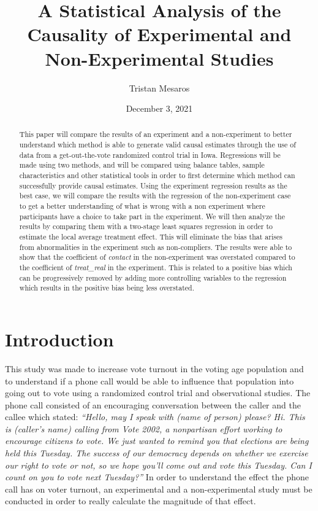 \documentclass[a4paper]{article}
\title{A Statistical Analysis of the Causality of Experimental and Non-Experimental Studies}
\author{Tristan Mesaros}
\affil{University of California, Santa Cruz}
\affil{Department of Economics}
\date{December 3, 2021}
\begin{document}
\maketitle

\begin{singlespace}
\begin{abstract}
This paper will compare the results of an experiment and a non-experiment to better understand which method is able to generate valid causal estimates through the use of data from a get-out-the-vote randomized control trial in Iowa. Regressions will be made using two methods, and will be compared using balance tables, sample characteristics and other statistical tools in order to first determine which method can successfully provide causal estimates. Using the experiment regression results as the best case, we will compare the results with the regression of the non-experiment case to get a better understanding of what is wrong with a non experiment where participants have a choice to take part in the experiment. We will then analyze the results by comparing them with a two-stage least squares regression in order to estimate the local average treatment effect. This will eliminate the bias that arises from abnormalities in the experiment such as non-compliers.  The results were able to show that the coefficient of \textit{contact} in the non-experiment was overstated compared to the coefficient of \textit{treat\_real} in the experiment. This is related to a positive bias which can be progressively removed by adding more controlling variables to the regression which results in the positive bias being less overstated.
\end{abstract}
\end{singlespace}
\newpage

\section{Introduction}

This study was made to increase vote turnout in the voting age population and to understand if a phone call would be able to influence that population into going out to vote using a randomized control trial and observational studies. The phone call consisted of an encouraging conversation between the caller and the callee which stated: \textit{“Hello, may I speak with (name of person) please? Hi. This is (caller’s name) calling from Vote 2002, a nonpartisan effort working to encourage citizens to vote. We just wanted to remind you that elections are being held this Tuesday. The success of our democracy depends on whether we exercise our right to vote or not, so we hope you’ll come out and vote this Tuesday. Can I count on you to vote next Tuesday?”} In order to understand the effect the phone call has on voter turnout, an experimental and a non-experimental study must be conducted in order to really  calculate the magnitude of that effect.
\end{document}
